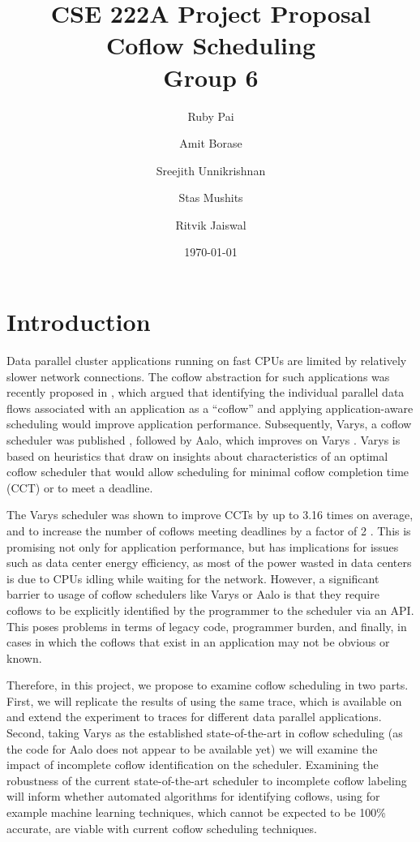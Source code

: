 \documentclass{article}
\begin{document}
\title{CSE 222A Project Proposal \\
		Coflow Scheduling \\
		\large Group 6}
\author{Ruby Pai \and Amit Borase \and Sreejith Unnikrishnan \and Stas Mushits \and Ritvik Jaiswal}
\date{\today}
\maketitle

\section{Introduction} \label{introduction}

Data parallel cluster applications running on fast CPUs are limited by relatively slower network connections. The coflow abstraction for such applications was recently proposed in \cite{chowdhury2012coflow}, which argued that identifying the individual parallel data flows associated with an application as a ``coflow'' and applying application-aware scheduling would improve application performance. Subsequently, Varys, a coflow scheduler was published \cite{chowdhury2014varys}, followed by Aalo, which improves on Varys \cite{chowdhury2015aalo}. Varys is based on heuristics that draw on insights about characteristics of an optimal coflow scheduler that would allow scheduling for minimal coflow completion time (CCT) or to meet a deadline.

The Varys scheduler was shown to improve CCTs by up to 3.16 times on average, and to increase the number of coflows meeting deadlines by a factor of 2 \cite{chowdhury2014varys}. This is promising not only for application performance, but has implications for issues such as data center energy efficiency, as most of the power wasted in data centers is due to CPUs idling while waiting for the network. However, a significant barrier to usage of coflow schedulers like Varys or Aalo is that they require coflows to be explicitly identified by the programmer to the scheduler via an API. This poses problems in terms of legacy code, programmer burden, and finally, in cases in which the coflows that exist in an application may not be obvious or known. 

Therefore, in this project, we propose to examine coflow scheduling in two parts. First, we will replicate the results of \cite{chowdhury2014varys} using the same trace, which is available on \cite{website:coflow-repo} and extend the experiment to traces for different data parallel applications. Second, taking Varys as the established state-of-the-art in coflow scheduling (as the code for Aalo does not appear to be available yet) we will examine the impact of incomplete coflow identification on the scheduler. Examining the robustness of the current state-of-the-art scheduler to incomplete coflow labeling will inform whether automated algorithms for identifying coflows, using for example machine learning techniques, which cannot be expected to be 100\% accurate, are viable with current coflow scheduling techniques.
\end{document}
